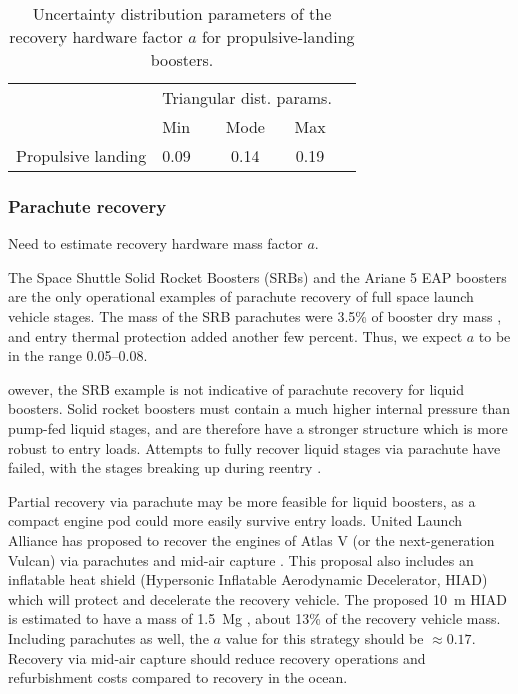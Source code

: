 \documentclass[conf]{../paper/new-aiaa}
\begin{document}
\begin{table}[hbt!]
    \centering
    \caption{\label{tab:propulsive_pref_factor_distributions} Uncertainty distribution parameters of the recovery hardware factor $a$ for propulsive-landing boosters.}
    \begin{tabular}{l l c c c}
    \hline
     & \multicolumn{3}{c}{Triangular dist. params.} \\
     & Min & Mode & Max \\
    \hline
    \hline
    Propulsive landing  & 0.09 & 0.14 & 0.19 \\
    \hline
    \end{tabular}
\end{table}


\subsubsection{Parachute recovery}
Need to estimate recovery hardware mass factor $a$.

The Space Shuttle Solid Rocket Boosters (SRBs) and the Ariane 5 EAP boosters are the only operational examples of parachute recovery of full space launch vehicle stages. The mass of the SRB parachutes were 3.5\% of booster dry mass \cite{Wolf1996}, and entry thermal protection added another few percent. Thus, we expect $a$ to be in the range \SIrange{0.05}{0.08}{}.

owever, the SRB example is not indicative of parachute recovery for liquid boosters. Solid rocket boosters must contain a much higher internal pressure than pump-fed liquid stages, and are therefore have a stronger structure which is more robust to entry loads. Attempts to fully recover liquid stages via parachute have failed, with the stages breaking up during reentry \cite{Spencer2011}.

Partial recovery via parachute may be more feasible for liquid boosters, as a compact engine pod could more easily survive entry loads. United Launch Alliance has proposed to recover the engines of Atlas V (or the next-generation Vulcan) via parachutes and mid-air capture \cite{Gravlee2008, Ragab2015}. This proposal also includes an inflatable heat shield (Hypersonic Inflatable Aerodynamic Decelerator, HIAD) which will protect and decelerate the recovery vehicle. The proposed \SI{10}{\meter} HIAD is estimated to have a mass of \SI{1.5}{\mega\gram} \cite{Bose2009}, about 13\% of the recovery vehicle mass. Including parachutes as well, the $a$ value for this strategy should be $\approx 0.17$. Recovery via mid-air capture should reduce recovery operations and refurbishment costs compared to recovery in the ocean.
\end{document}
